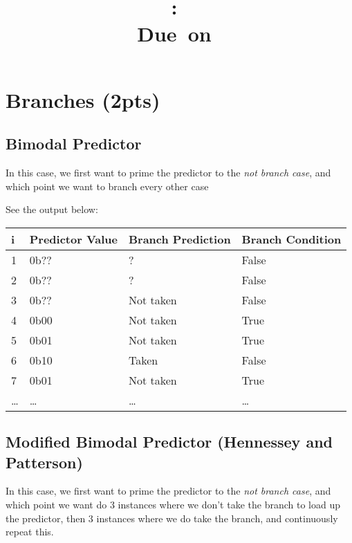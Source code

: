 \documentclass{article}
\title{
\vspace{2in}
\textmd{\textbf{\hmwkClass:\ \hmwkTitle}}\\
\normalsize\vspace{0.1in}\small{Due\ on\ \hmwkDueDate}\\
\vspace{0.1in}\large{\textit{\hmwkClassInstructor}}
\vspace{3in}
}
\author{\textbf{\hmwkAuthorName}}
\date{} %
\begin{document}
\maketitle
\newpage




%


\section{Branches (2pts)}
\subsection{Bimodal Predictor}
In this case, we first want to prime the predictor to the \emph{not branch case}, and which point we want to branch every other case


See the output below:\\
\begin{tabular}{| l | l | l | l |}
\hline
  \bf{i} & \bf{Predictor Value} & \bf{Branch Prediction} & \bf{Branch Condition} \\\hline
  1 & 0b?? & ? & False \\\hline
  2 & 0b?? & ? & False \\\hline
  3 & 0b?? & Not taken & False \\\hline
  4 & 0b00 & Not taken & True \\\hline
  5 & 0b01 & Not taken & True \\\hline
  6 & 0b10 & Taken & False \\\hline
  7 & 0b01 & Not taken & True \\\hline
  \dots & \dots & \dots & \dots \\\hline
\end{tabular}
  
\subsection{Modified Bimodal Predictor (Hennessey and Patterson)}
In this case, we first want to prime the predictor to the \emph{not branch case}, and which point we want do 3 instances where we don't take the branch to load up the predictor, then 3 instances where we do take the branch, and continuously repeat this.

\end{document}
